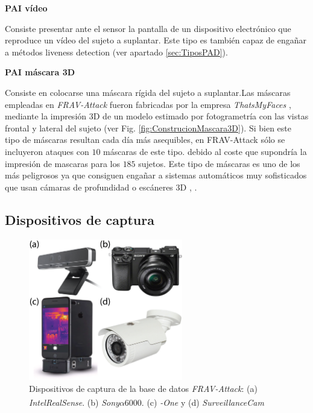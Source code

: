 \medskip
\textbf{PAI vídeo}

Consiste presentar ante el sensor la pantalla de un dispositivo electrónico que reproduce un vídeo del sujeto a suplantar. Este tipo  es también capaz de engañar a métodos \gls{liveness detection}  (ver apartado \ref{sec:TiposPAD}).

\medskip
\textbf{PAI máscara 3D}

Consiste en colocarse una máscara rígida del sujeto a suplantar.Las máscaras empleadas en \textit{\Gls{FRAV-Attack}} fueron fabricadas por la empresa \textit{ThatsMyFaces} \cite{ThatsMyFaceOnline}, mediante la impresión $3$D de un modelo estimado por fotogrametría con las vistas frontal y lateral del sujeto (ver Fig. \ref{fig:ConstrucionMascara3D}). Si bien este tipo de máscaras resultan cada día más asequibles, en \Gls{FRAV-Attack} sólo se incluyeron ataques con $10$ máscaras de este tipo. debido al coste que supondría la impresión de mascaras para los $185$ sujetos. Este tipo de máscaras es uno de los más peligrosos  ya que consiguen engañar a sistemas automáticos muy sofisticados que usan cámaras de profundidad o escáneres $3$D \cite{erdogmus2014spoofing}, \cite{jia2019survey} \cite{li2016generalized}.
\medskip

\subsection{Dispositivos de captura}\label{subsec:Dispositivos-FRAV-Attack}

\begin{figure}[t!]
\centering
\includegraphics[width=0.6\textwidth]{ch-sistemasABC/images/ch-BBDDs/SENSORES.png}
    \caption{Dispositivos de captura de la base de datos \textit{\Gls{FRAV-Attack}}: (a) \textit{Intel\textsuperscript{\textregistered}RealSense\textsuperscript{\texttrademark}}. (b) \textit{Sony\textsuperscript{\textregistered}$\alpha6000$}. (c) \textit{-One} y (d) \textit{SurveillanceCam}}
    \label{fig:SENSORES}
\end{figure}


